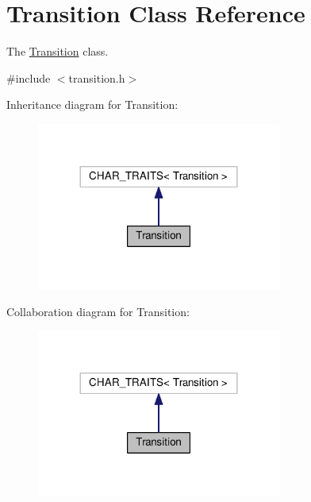 \hypertarget{class_transition}{}\section{Transition Class Reference}
\label{class_transition}


The \hyperlink{class_transition}{Transition} class.  




{\ttfamily \#include $<$transition.\+h$>$}



Inheritance diagram for Transition\+:\nopagebreak
\begin{figure}[H]
\begin{center}
\leavevmode
\includegraphics[width=228pt]{class_transition__inherit__graph}
\end{center}
\end{figure}


Collaboration diagram for Transition\+:\nopagebreak
\begin{figure}[H]
\begin{center}
\leavevmode
\includegraphics[width=228pt]{class_transition__coll__graph}
\end{center}
\end{figure}
